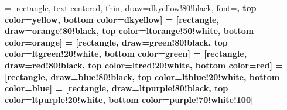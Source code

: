 

 = [rectangle, 
                    text centered,
                    thin,
                    draw=dkyellow!80!black,
                    font=\bfseries,
                    top color=yellow,
                    bottom color=dkyellow]
 = [rectangle, 
                    draw=orange!80!black,
                    top color=ltorange!50!white,
                    bottom color=orange]
 = [rectangle, 
                    draw=green!80!black,
                    top color=ltgreen!20!white,
                    bottom color=green]
 = [rectangle, 
                    draw=red!80!black,
                    top color=ltred!20!white,
                    bottom color=red]
 = [rectangle, 
                    draw=blue!80!black,
                    top color=ltblue!20!white,
                    bottom color=blue]
 = [rectangle, 
                      draw=ltpurple!80!black,
                      top color=ltpurple!20!white,
                      bottom color=purple!70!white!100]

